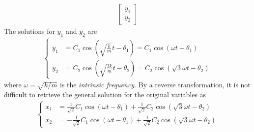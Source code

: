 \begin{Answer}
\begin{align*}
\begin{bmatrix}
y_1\\
y_2
\end{bmatrix}
\end{align*}
The solutions for $y_1$ and $y_2$ are
\begin{align*}
\left\{\begin{alignedat}{1}
y_1 &= C_1\cos(\sqrt{\frac{k}{m}}t-\theta_1) = C_1\cos(\omega t-\theta_1)\\
y_2 &= C_2\cos(\sqrt{\frac{3k}{m}}t-\theta_2) = C_2\cos(\sqrt{3}\omega t-\theta_2)
\end{alignedat}\right.
\end{align*}
where $\omega = \sqrt{k/m}$ is the \textit{intrinsic frequency}. By a reverse transformation, it is not difficult to retrieve the general solution for the original variables as
\begin{align*}
\left\{\begin{alignedat}{1}
x_1 &= \frac{1}{\sqrt{2}}C_1\cos(\omega t-\theta_1) + \frac{1}{\sqrt{2}}C_2\cos(\sqrt{3}\omega t-\theta_2)\\
x_2 &= -\frac{1}{\sqrt{2}}C_1\cos(\omega t-\theta_1) + \frac{1}{\sqrt{2}}C_2\cos(\sqrt{3}\omega t-\theta_2)
\end{alignedat}\right.
\end{align*}
\end{Answer}